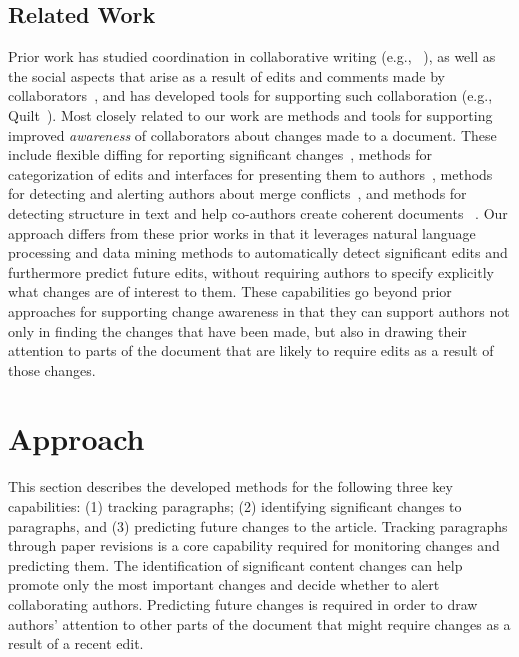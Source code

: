 \subsection{Related Work}\label{related-work}

Prior work has studied coordination in collaborative writing (e.g.,
~\cite{neuwirth2001computer,kittur2007he}), as well as the social
aspects that arise as a result of edits and comments made by
collaborators~\cite{birnholtz2012tracking,birnholtz2013write}, and has
developed tools for supporting such collaboration (e.g.,
Quilt~\cite{fish1988quilt}). Most closely related to our work are
methods and tools for supporting improved \emph{awareness} of
collaborators about changes made to a document. These include flexible
diffing for reporting significant changes~\cite{neuwirth1992flexible},
methods for categorization of edits and interfaces for presenting them
to
authors~\cite{fong2010did,papadopoulou2007structured,tam2006framework},
methods for detecting and alerting authors about merge
conflicts~\cite{hainsworth2006enabling}, and methods for detecting
structure in text and help co-authors create coherent documents~
\cite{de2007narrative}. Our approach differs from these prior works in
that it leverages natural language processing and data mining methods to
automatically detect significant edits and furthermore predict future
edits, without requiring authors to specify explicitly what changes are
of interest to them. These capabilities go beyond prior approaches for
supporting change awareness in that they can support authors not only in
finding the changes that have been made, but also in drawing their
attention to parts of the document that are likely to require edits as a
result of those changes.

\section{Approach}\label{approach}

This section describes the developed methods for the following three key
capabilities: (1) tracking paragraphs; (2) identifying significant
changes to paragraphs, and (3) predicting future changes to the article.
Tracking paragraphs through paper revisions is a core capability
required for monitoring changes and predicting them. The identification
of significant content changes can help promote only the most important
changes and decide whether to alert collaborating authors. Predicting
future changes is required in order to draw authors' attention to other
parts of the document that might require changes as a result of a recent
edit.

